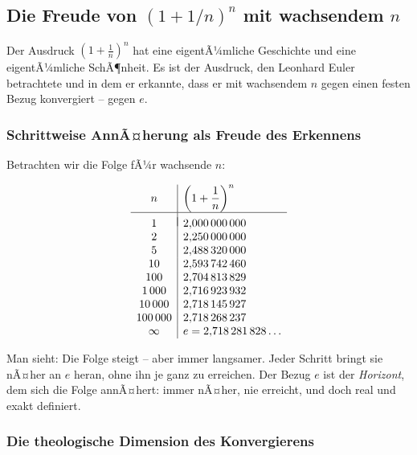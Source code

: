 ﻿\documentclass[a4paper,12pt]{article}
\theoremstyle{definition}
\begin{document}
\subsection{Die Freude von $(1 + 1/n)^n$ mit wachsendem $n$}

Der Ausdruck $\left(1 + \frac{1}{n}\right)^n$ hat eine eigentÃ¼mliche Geschichte
und eine eigentÃ¼mliche SchÃ¶nheit. Es ist der Ausdruck, den Leonhard Euler betrachtete
und in dem er erkannte, dass er mit wachsendem $n$ gegen einen festen Bezug
konvergiert -- gegen $e$.

\subsubsection{Schrittweise AnnÃ¤herung als Freude des Erkennens}

Betrachten wir die Folge fÃ¼r wachsende $n$:

\begin{equation}
	\begin{array}{c|l}
		n & \left(1 + \dfrac{1}{n}\right)^n \\[6pt]
		\hline\\[-8pt]
		1   & 2{,}000\,000\,000 \\
		2   & 2{,}250\,000\,000 \\
		5   & 2{,}488\,320\,000 \\
		10  & 2{,}593\,742\,460 \\
		100 & 2{,}704\,813\,829 \\
		1\,000   & 2{,}716\,923\,932 \\
		10\,000  & 2{,}718\,145\,927 \\
		100\,000 & 2{,}718\,268\,237 \\
		\infty   & e = 2{,}718\,281\,828\ldots
	\end{array}
\end{equation}

Man sieht: Die Folge steigt -- aber immer langsamer. Jeder Schritt bringt sie
nÃ¤her an $e$ heran, ohne ihn je ganz zu erreichen. Der Bezug $e$ ist der
\textit{Horizont}, dem sich die Folge annÃ¤hert: immer nÃ¤her, nie erreicht,
und doch real und exakt definiert.

\subsubsection{Die theologische Dimension des Konvergierens}
\end{document}

